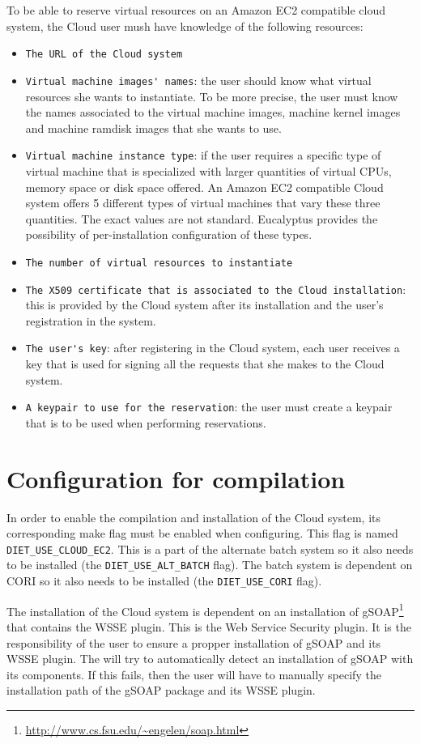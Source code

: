 To be able to reserve virtual resources on an Amazon EC2 compatible cloud system, the Cloud user
mush have knowledge of the following resources:
\begin{itemize}
\item \verb!The URL of the Cloud system!
\item \verb!Virtual machine images' names!: the user should know what virtual resources she wants
to instantiate. To be more precise, the user must know the names associated to the virtual machine
images, machine kernel images and machine ramdisk images that she wants to use.
\item \verb!Virtual machine instance type!: if the user requires a specific type of virtual machine
that is specialized with larger quantities of virtual CPUs, memory space or disk space offered.
An Amazon EC2 compatible Cloud system offers 5 different types of virtual machines that vary these
three quantities. The exact values are not standard. Eucalyptus provides the possibility of
per-installation configuration of these types.
\item \verb!The number of virtual resources to instantiate!
\item \verb!The X509 certificate that is associated to the Cloud installation!: this is provided by
the Cloud system after its installation and the user's registration in the system.
\item \verb!The user's key!: after registering in the Cloud system, each user receives a key
that is used for signing all the requests that she makes to the Cloud system.
\item \verb!A keypair to use for the reservation!: the user must create a keypair that is to be used
when performing reservations.
\end{itemize}


\section{Configuration for compilation}

In order to enable the compilation and installation of the \diet Cloud system, its corresponding make flag
must be enabled when configuring. This flag is named \verb!DIET_USE_CLOUD_EC2!. This is a part of
the alternate batch system so it also needs to be installed (the \verb!DIET_USE_ALT_BATCH! flag). The \diet
batch system is dependent on CORI so it also needs to be installed (the \verb!DIET_USE_CORI! flag).

The installation of the Cloud system is dependent on an installation of gSOAP\footnote{\url{http://www.cs.fsu.edu/~engelen/soap.html}}
that contains the WSSE plugin.
This is the Web Service Security plugin. It is the responsibility of the \diet user to ensure a propper
installation of gSOAP and its WSSE plugin. The will try to automatically detect an installation of gSOAP
with its components. If this fails, then the \diet user will have to manually specify the installation
path of the gSOAP package and its WSSE plugin.

